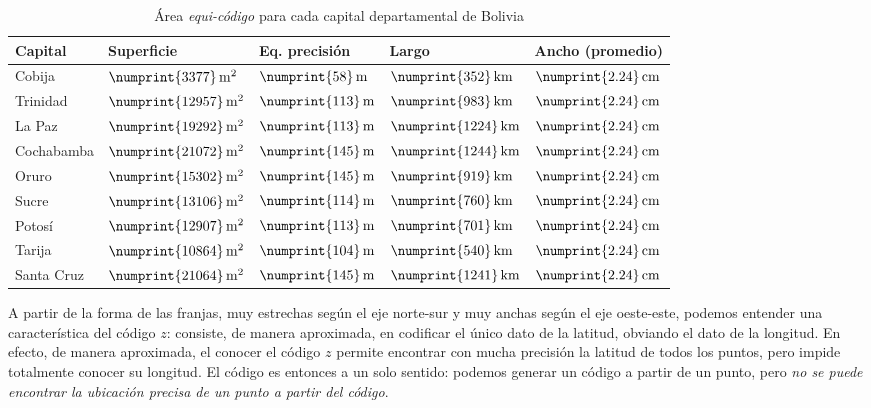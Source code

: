\documentclass[letterpaper]{article}
\begin{document}
\begin{table}
	\centering
	\begin{tabu} to \linewidth {|l|l|l|l|l|}
		\hline
		Capital & Superficie & Eq. precisión & Largo & Ancho (promedio) \\
		\hline
		Cobija & \(\numprint{3377}\,\mathrm{m^{2}}\) & \(\numprint{58}\,\mathrm{m}\) & \(\numprint{352}\,\mathrm{km}\) & \(\numprint{2.24}\,\mathrm{cm}\) \\
		Trinidad & \(\numprint{12957}\,\mathrm{m^{2}}\) & \(\numprint{113}\,\mathrm{m}\) & \(\numprint{983}\,\mathrm{km}\) & \(\numprint{2.24}\,\mathrm{cm}\) \\
		La Paz & \(\numprint{19292}\,\mathrm{m^{2}}\) & \(\numprint{113}\,\mathrm{m}\) & \(\numprint{1224}\,\mathrm{km}\) & \(\numprint{2.24}\,\mathrm{cm}\) \\
		Cochabamba & \(\numprint{21072}\,\mathrm{m^{2}}\) & \(\numprint{145}\,\mathrm{m}\) & \(\numprint{1244}\,\mathrm{km}\) & \(\numprint{2.24}\,\mathrm{cm}\) \\
		Oruro & \(\numprint{15302}\,\mathrm{m^{2}}\) & \(\numprint{145}\,\mathrm{m}\) & \(\numprint{919}\,\mathrm{km}\) & \(\numprint{2.24}\,\mathrm{cm}\) \\
		Sucre & \(\numprint{13106}\,\mathrm{m^{2}}\) & \(\numprint{114}\,\mathrm{m}\) & \(\numprint{760}\,\mathrm{km}\) & \(\numprint{2.24}\,\mathrm{cm}\) \\
		Potosí & \(\numprint{12907}\,\mathrm{m^{2}}\) & \(\numprint{113}\,\mathrm{m}\) & \(\numprint{701}\,\mathrm{km}\) & \(\numprint{2.24}\,\mathrm{cm}\) \\
		Tarija & \(\numprint{10864}\,\mathrm{m^{2}}\) & \(\numprint{104}\,\mathrm{m}\) & \(\numprint{540}\,\mathrm{km}\) & \(\numprint{2.24}\,\mathrm{cm}\) \\
		Santa Cruz & \(\numprint{21064}\,\mathrm{m^{2}}\) & \(\numprint{145}\,\mathrm{m}\) & \(\numprint{1241}\,\mathrm{km}\) & \(\numprint{2.24}\,\mathrm{cm}\) \\
		\hline
	\end{tabu}
	\caption{Área \emph{equi-código} para cada capital departamental de Bolivia}
	\label{tab:capitales}
\end{table}

A partir de la forma de las franjas, muy estrechas según el eje
norte-sur y muy anchas según el eje oeste-este, podemos entender una
característica del código \(z\): consiste, de manera aproximada, en
codificar el único dato de la latitud, obviando el dato de la
longitud. En efecto, de manera aproximada, el conocer el código \(z\)
permite encontrar con mucha precisión la latitud de todos los
puntos, pero impide totalmente conocer su longitud. El código es
entonces a un solo sentido: podemos generar un código a partir de un
punto, pero \emph{no se puede encontrar la ubicación precisa de un
punto a partir del código}.
\end{document}
